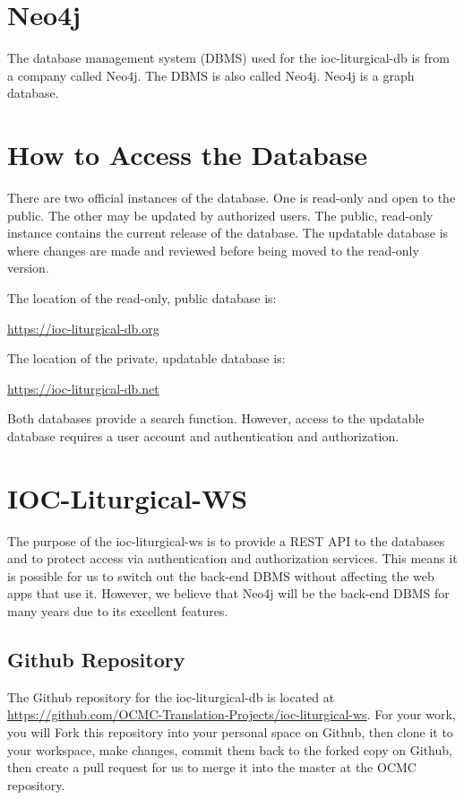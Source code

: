 \documentclass[]{memoir}
\def\iocLDb{ioc-liturgical-db }%
\begin{document}
\section{Neo4j}

The database management system (DBMS) used for the \iocLDb is from a company called Neo4j.  The DBMS is also called Neo4j. Neo4j is a graph database.

\section{How to Access the Database}

There are two official instances of the database.  One is read-only and open to the public.  The other may be updated by authorized users.  The public, read-only instance contains the current release of the database.  The updatable database is where changes are made and reviewed before being moved to the read-only version.

The location of the read-only, public database is:

\url{https://ioc-liturgical-db.org}

The location of the private, updatable database is:

\url{https://ioc-liturgical-db.net}

Both databases provide a search function.  However, access to the updatable database requires a user account and authentication and authorization.

\section{IOC-Liturgical-WS}

The purpose of the ioc-liturgical-ws is to provide a REST API to the databases and to protect access via authentication and authorization services.  This means it is possible for us to switch out the back-end DBMS without affecting the web apps that use it.  However, we believe that Neo4j will be the back-end DBMS for many years due to its excellent features.  

\subsection{Github Repository}

The Github repository for the ioc-liturgical-db is located at \url{https://github.com/OCMC-Translation-Projects/ioc-liturgical-ws}.  For your work, you will Fork this repository into your personal space on Github, then clone it to your workspace, make changes, commit them back to the forked copy on Github, then create a pull request for us to merge it into the master at the OCMC repository.
\end{document}
